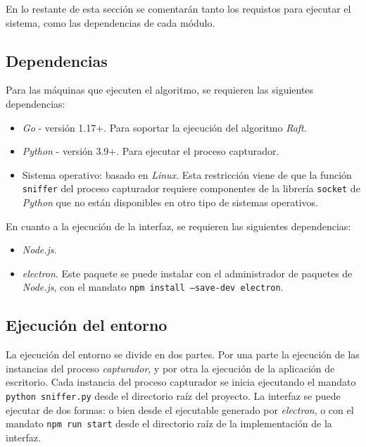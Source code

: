 En lo restante de esta sección se comentarán tanto los requistos para ejecutar el sistema, como las dependencias de cada módulo.

\subsection{Dependencias}

Para las máquinas que ejecuten el algoritmo, se requieren las siguientes dependencias:

\begin{itemize}
\item \textit{Go} - versión 1.17+. Para soportar la ejecución del algoritmo \textit{Raft}.
\item \textit{Python} - versión 3.9+. Para ejecutar el proceso capturador.
\item Sistema operativo: basado en \textit{Linux}. Esta restricción viene de que la función \texttt{sniffer} del proceso capturador requiere componentes de la librería \texttt{socket} de \textit{Python} que no están disponibles en otro tipo de sistemas operativos.
\end{itemize}

En cuanto a la ejecución de la interfaz, se requieren las siguientes dependencias:

\begin{itemize}
\item \textit{Node.js}.
\item \textit{electron}. Este paquete se puede instalar con el administrador de paquetes de \textit{Node.js}, con el mandato \texttt{npm install --save-dev electron}.
\end{itemize}

\newpage

\subsection{Ejecución del entorno}

La ejecución del entorno se divide en dos partes. Por una parte la ejecución de las instancias del proceso \textit{capturador}, y por  otra la ejecución de la aplicación de escritorio. Cada instancia del proceso capturador se inicia ejecutando el mandato \texttt{python sniffer.py} desde el directorio raíz del proyecto. La interfaz se puede ejecutar de dos formas: o bien desde el ejecutable generado por \textit{electron}, o con el mandato \texttt{npm run start} desde el directorio raíz de la implementación de la interfaz.
